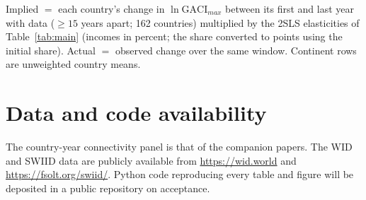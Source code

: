 \begin{table}[H]
\centering
\caption{Implied incidence of observed hub-connectivity growth, first to last year (1996--2023).}
\label{tab:a_aggregate}
\begin{minipage}{\linewidth}
\centering
{}
\par\vspace{3pt}\begin{flushleft}\footnotesize Implied $=$ each country's change in $\ln\mathrm{GACI}_{max}$ between its first and last year with data ($\geq 15$ years apart; 162 countries) multiplied by the 2SLS elasticities of Table~\ref{tab:main} (incomes in percent; the share converted to points using the initial share). Actual $=$ observed change over the same window. Continent rows are unweighted country means.\end{flushleft}
\end{minipage}
\end{table}


\section*{Data and code availability}
The country-year connectivity panel is that of the companion papers. The WID and SWIID data are publicly available from \url{https://wid.world} and \url{https://fsolt.org/swiid/}. Python code reproducing every table and figure will be deposited in a public repository on acceptance.





